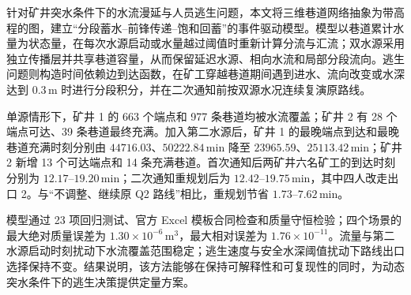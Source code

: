 针对矿井突水条件下的水流漫延与人员逃生问题，本文将三维巷道网络抽象为带高程的图，建立“分段蓄水--前锋传递--饱和回蓄”的事件驱动模型。模型以巷道累计水量为状态量，在每次水源启动或水量越过阈值时重新计算分流与汇流；双水源采用独立传播层并共享巷道容量，从而保留延迟水源、相向水流和局部分段流向。逃生问题则构造时间依赖边到达函数，在矿工穿越巷道期间遇到进水、流向改变或水深达到 $0.3\,\mathrm{m}$ 时进行分段积分，并在二次通知前按双源水况连续复演原路线。

单源情形下，矿井 1 的 663 个端点和 977 条巷道均被水流覆盖；矿井 2 有 28 个端点可达、39 条巷道最终充满。加入第二水源后，矿井 1 的最晚端点到达和最晚巷道充满时刻分别由 $44716.03$、$50222.84\,\mathrm{min}$ 降至 $23965.59$、$25113.42\,\mathrm{min}$；矿井 2 新增 13 个可达端点和 14 条充满巷道。首次通知后两矿井六名矿工的到达时刻分别为 $12.17$--$19.20\,\mathrm{min}$；二次通知重规划后为 $12.42$--$19.75\,\mathrm{min}$，其中四人改走出口 2。与“不调整、继续原 Q2 路线”相比，重规划节省 $1.73$--$7.62\,\mathrm{min}$。

模型通过 23 项回归测试、官方 Excel 模板合同检查和质量守恒检验；四个场景的最大绝对质量误差为 $1.30\times10^{-6}\,\mathrm{m^3}$，最大相对误差为 $1.76\times10^{-11}$。流量与第二水源启动时刻扰动下水流覆盖范围稳定；逃生速度与安全水深阈值扰动下路线出口选择保持不变。结果说明，该方法能够在保持可解释性和可复现性的同时，为动态突水条件下的逃生决策提供定量方案。
